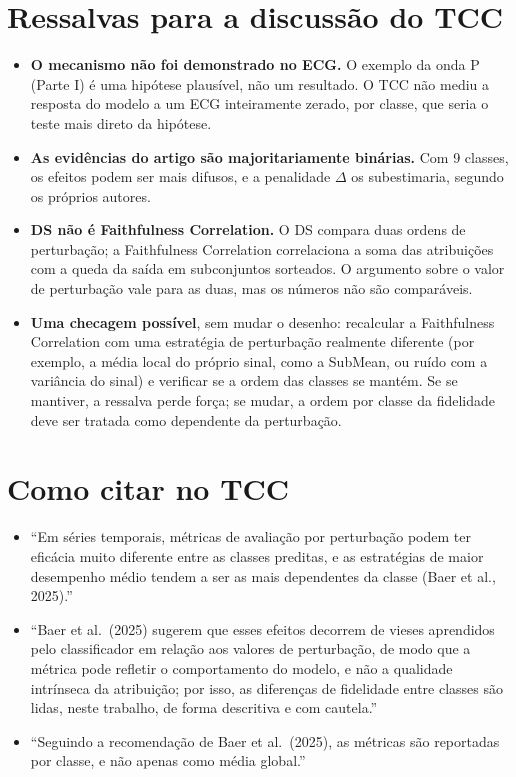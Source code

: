 \documentclass[11pt,a4paper]{article}
\begin{document}
\section{Ressalvas para a discussão do TCC}
\begin{itemize}
\item \textbf{O mecanismo não foi demonstrado no ECG.} O exemplo da onda P (Parte I) é uma hipótese plausível, não um resultado. O TCC não mediu a resposta do modelo a um ECG inteiramente zerado, por classe, que seria o teste mais direto da hipótese.
\item \textbf{As evidências do artigo são majoritariamente binárias.} Com 9 classes, os efeitos podem ser mais difusos, e a penalidade $\Delta$ os subestimaria, segundo os próprios autores.
\item \textbf{DS não é Faithfulness Correlation.} O DS compara duas ordens de perturbação; a Faithfulness Correlation correlaciona a soma das atribuições com a queda da saída em subconjuntos sorteados. O argumento sobre o valor de perturbação vale para as duas, mas os números não são comparáveis.
\item \textbf{Uma checagem possível}, sem mudar o desenho: recalcular a Faithfulness Correlation com uma estratégia de perturbação realmente diferente (por exemplo, a média local do próprio sinal, como a SubMean, ou ruído com a variância do sinal) e verificar se a ordem das classes se mantém. Se se mantiver, a ressalva perde força; se mudar, a ordem por classe da fidelidade deve ser tratada como dependente da perturbação.
\end{itemize}

\section{Como citar no TCC}
\begin{itemize}
\item “Em séries temporais, métricas de avaliação por perturbação podem ter eficácia muito diferente entre as classes preditas, e as estratégias de maior desempenho médio tendem a ser as mais dependentes da classe (Baer et al., 2025).”
\item “Baer et al.\ (2025) sugerem que esses efeitos decorrem de vieses aprendidos pelo classificador em relação aos valores de perturbação, de modo que a métrica pode refletir o comportamento do modelo, e não a qualidade intrínseca da atribuição; por isso, as diferenças de fidelidade entre classes são lidas, neste trabalho, de forma descritiva e com cautela.”
\item “Seguindo a recomendação de Baer et al.\ (2025), as métricas são reportadas por classe, e não apenas como média global.”
\end{itemize}
\end{document}
